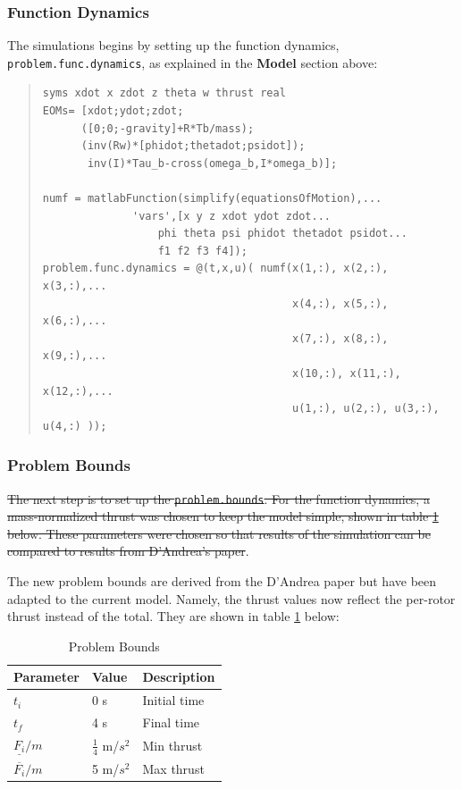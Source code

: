 \documentclass[12pt]{article}
\begin{document}
\subsubsection{Function Dynamics}
The simulations begins by setting up the function dynamics, \lstinline!problem.func.dynamics!, as explained in the \textbf{Model} section above: 
\begin{quote}
\begin{lstlisting}
syms xdot x zdot z theta w thrust real
EOMs= [xdot;ydot;zdot;
      ([0;0;-gravity]+R*Tb/mass);
      (inv(Rw)*[phidot;thetadot;psidot]);
       inv(I)*Tau_b-cross(omega_b,I*omega_b)];

numf = matlabFunction(simplify(equationsOfMotion),...
   		      'vars',[x y z xdot ydot zdot...
			      phi theta psi phidot thetadot psidot...
			      f1 f2 f3 f4]);
problem.func.dynamics = @(t,x,u)( numf(x(1,:), x(2,:), x(3,:),...
                                       x(4,:), x(5,:), x(6,:),...
                                       x(7,:), x(8,:), x(9,:),...
                                       x(10,:), x(11,:), x(12,:),...
                                       u(1,:), u(2,:), u(3,:), u(4,:) ));

\end{lstlisting}
\end{quote}

\subsubsection{Problem Bounds}
\sout{The next step is to set up the \lstinline!problem.bounds!. For the function dynamics, a mass-normalized thrust was chosen to keep the model simple, shown in table \ref{Problem Bounds} below. These parameters were chosen so that results of the simulation can be compared to results from D'Andrea's paper}\cite{D'Andrea}.

The new problem bounds are derived from the D'Andrea paper but have been adapted to the current model.  Namely, the thrust values now reflect the per-rotor thrust instead of the total.  They are shown in table \ref{Problem Bounds} below:

\begin{table}[H]
\begin{center}
\begin{tabular}{ |p{2.5cm}||p{2cm}||p{3cm}| }

 \hline
 Parameter & Value & Description\\
 \hline
 $t_{i}$   & 0 s  & Initial time\\
 $t_{f}$  & 4 s  & Final time\\
 $\underline{F_{i}}/m$ & $\frac{1}{4}$ m/$s^{2}$ & Min thrust\\
 $\overline{F_{i}}/m$ & 5 m/$s^{2}$ & Max thrust\\
  \hline
\end{tabular}
\caption{Problem Bounds }
\label{Problem Bounds}
\end{center}
\end{table}
\end{document}
